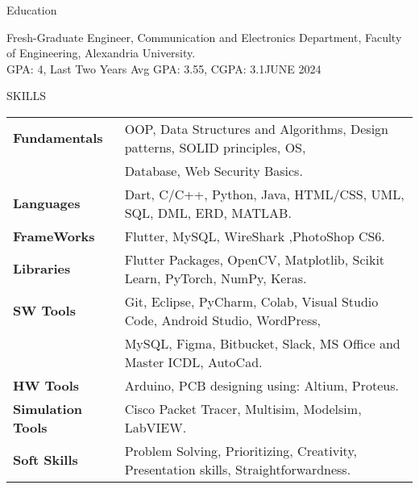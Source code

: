 \documentclass{resume} %
\begin{document}
\begin{rSection}{PROJECTS} 
    \href{https://github.com/AsmaaJAH}{https://github.com/AsmaaJAH }}  
\end{rSection}





\begin{rSection}{Education}

Fresh-Graduate Engineer, Communication and Electronics Department, Faculty of Engineering, Alexandria University.\\ {\small GPA: 4, Last Two Years Avg GPA: 3.55, CGPA: 3.1\hfill {JUNE 2024}}


\end{rSection}


\begin{rSection}{SKILLS}
\begin{tabular}{ @{} >{\bfseries}l @{\hspace{6ex}} l }
Fundamentals & OOP, Data Structures and Algorithms, Design patterns, SOLID principles, OS,\\ & Database, Web Security Basics.\\
Languages & Dart, C/C++, Python, Java, HTML/CSS, UML, SQL, DML, ERD, MATLAB.\\
FrameWorks &  Flutter, MySQL, WireShark ,PhotoShop CS6.\\
Libraries & Flutter Packages, OpenCV, Matplotlib, Scikit Learn, PyTorch, NumPy, Keras.\\
SW Tools & Git, Eclipse, PyCharm, Colab, Visual Studio Code, Android Studio, WordPress,\\ & MySQL, Figma, Bitbucket, Slack, MS Office and Master ICDL, AutoCad.\\
HW Tools & Arduino, PCB designing using: Altium, Proteus.\\
Simulation Tools& Cisco Packet Tracer, Multisim, Modelsim, LabVIEW.\\
Soft Skills &  Problem Solving, Prioritizing, Creativity, Presentation skills, Straightforwardness.\\
\end{tabular}\\
\end{rSection}
\end{document}
